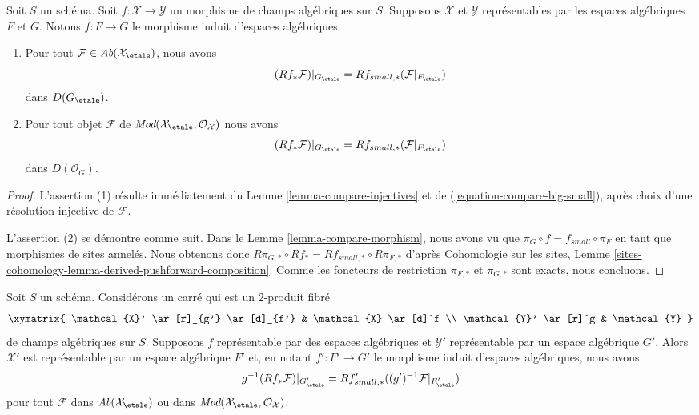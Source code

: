 \begin{lemma}
\label{lemma-compare-morphism-cohomology}
Soit $S$ un schéma. Soit $f : \mathcal{X} \to \mathcal{Y}$ un morphisme
de champs algébriques sur $S$. Supposons $\mathcal{X}$ et $\mathcal{Y}$
représentables par les espaces algébriques $F$ et $G$. Notons $f : F \to G$ le
morphisme induit d'espaces algébriques.
\begin{enumerate}
\item Pour tout $\mathcal{F} \in \textit{Ab}(\mathcal{X}_\etale)$,
nous avons
$$
(Rf_*\mathcal{F})|_{G_\etale} =
Rf_{small, *}(\mathcal{F}|_{F_\etale})
$$
dans $D(G_\etale)$.
\item Pour tout objet $\mathcal{F}$ de
$\textit{Mod}(\mathcal{X}_\etale, \mathcal{O}_\mathcal{X})$
nous avons
$$
(Rf_*\mathcal{F})|_{G_\etale} =
Rf_{small, *}(\mathcal{F}|_{F_\etale})
$$
dans $D(\mathcal{O}_G)$.
\end{enumerate}
\end{lemma}

\begin{proof}
L'assertion (1) résulte immédiatement du
Lemme \ref{lemma-compare-injectives}
et de (\ref{equation-compare-big-small}),
après choix d'une résolution injective de $\mathcal{F}$.

\medskip\noindent
L'assertion (2) se démontre comme suit. Dans le Lemme \ref{lemma-compare-morphism},
nous avons vu que $\pi_G \circ f = f_{small} \circ \pi_F$ en tant que morphismes
de sites annelés. Nous obtenons donc
$R\pi_{G, *} \circ Rf_* = Rf_{small, *} \circ R\pi_{F, *}$
d'après Cohomologie sur les sites, Lemme
\ref{sites-cohomology-lemma-derived-pushforward-composition}.
Comme les foncteurs de restriction $\pi_{F, *}$ et $\pi_{G, *}$
sont exacts, nous concluons.
\end{proof}

\begin{lemma}
\label{lemma-compare-representable-morphism-cohomology}
Soit $S$ un schéma. Considérons un carré qui est un $2$-produit fibré
$$
\xymatrix{
\mathcal{X}' \ar[r]_{g'} \ar[d]_{f'} & \mathcal{X} \ar[d]^f \\
\mathcal{Y}' \ar[r]^g & \mathcal{Y}
}
$$
de champs algébriques sur $S$. Supposons $f$ représentable par des espaces
algébriques et $\mathcal{Y}'$ représentable par un espace algébrique $G'$.
Alors $\mathcal{X}'$ est représentable par un espace algébrique $F'$ et,
en notant $f' : F' \to G'$ le morphisme induit d'espaces algébriques,
nous avons
$$
g^{-1}(Rf_*\mathcal{F})|_{G'_\etale} =
Rf'_{small, *}((g')^{-1}\mathcal{F}|_{F'_\etale})
$$
pour tout $\mathcal{F}$ dans $\textit{Ab}(\mathcal{X}_\etale)$
ou dans
$\textit{Mod}(\mathcal{X}_\etale, \mathcal{O}_\mathcal{X})$.
\end{lemma}


